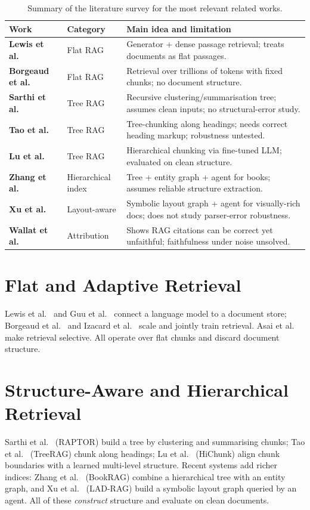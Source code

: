 \documentclass[12pt,a4paper]{report}
\begin{document}
\begin{table}[!htbp]\centering
\caption{Summary of the literature survey for the most relevant related works.}
\label{tab:lit}\renewcommand{\arraystretch}{1.3}{\small
\begin{tabularx}{\textwidth}{@{} >{\bfseries}p{2.6cm} p{2.6cm} X @{}}
\toprule Work & Category & Main idea and limitation \\ \midrule
Lewis et al.~\cite{lewis2020rag} & Flat RAG & Generator + dense passage retrieval; treats documents as flat passages. \\
Borgeaud et al.~\cite{borgeaud2022retro} & Flat RAG & Retrieval over trillions of tokens with fixed chunks; no document structure. \\
Sarthi et al.~\cite{sarthi2024raptor} & Tree RAG & Recursive clustering/summarisation tree; assumes clean inputs; no structural-error study. \\
Tao et al.~\cite{tao2025treerag} & Tree RAG & Tree-chunking along headings; needs correct heading markup; robustness untested. \\
Lu et al.~\cite{lu2026hichunk} & Tree RAG & Hierarchical chunking via fine-tuned LLM; evaluated on clean structure. \\
Zhang et al.~\cite{bookrag2025} & Hierarchical index & Tree + entity graph + agent for books; assumes reliable structure extraction. \\
Xu et al.~\cite{ladrag2025} & Layout-aware & Symbolic layout graph + agent for visually-rich docs; does not study parser-error robustness. \\
Wallat et al.~\cite{wallat2025faith} & Attribution & Shows RAG citations can be correct yet unfaithful; faithfulness under noise unsolved. \\
\bottomrule
\end{tabularx}}
\end{table}

\section{Flat and Adaptive Retrieval}
Lewis et al.~\cite{lewis2020rag} and Guu et al.~\cite{guu2020realm} connect a language model to a
document store; Borgeaud et al.~\cite{borgeaud2022retro} and Izacard et al.~\cite{izacard2023atlas}
scale and jointly train retrieval. Asai et al.~\cite{asai2024selfrag} make retrieval selective.
All operate over flat chunks and discard document structure.

\section{Structure-Aware and Hierarchical Retrieval}
Sarthi et al.~\cite{sarthi2024raptor} (RAPTOR) build a tree by clustering and summarising chunks;
Tao et al.~\cite{tao2025treerag} (TreeRAG) chunk along headings; Lu et al.~\cite{lu2026hichunk}
(HiChunk) align chunk boundaries with a learned multi-level structure. Recent systems add richer
indices: Zhang et al.~\cite{bookrag2025} (BookRAG) combine a hierarchical tree with an entity graph,
and Xu et al.~\cite{ladrag2025} (LAD-RAG) build a symbolic layout graph queried by an agent. All of
these \emph{construct} structure and evaluate on clean documents.
\end{document}
